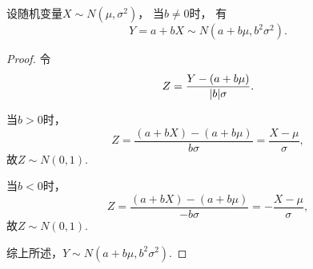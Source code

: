 \begin{proposition}\label{theorem:正态分布与自然指数分布族.正态分布的线性性质}
设随机变量\(X \sim N(\mu,\sigma^2)\)，
当\(b \neq 0\)时，
有\begin{equation}
	Y = a+bX \sim N(a+b\mu,b^2\sigma^2).
\end{equation}
\begin{proof}
令\[
	Z = \frac{Y-(a+b\mu)}{\abs{b}\sigma}.
\]

当\(b > 0\)时，\[
	Z = \frac{(a+bX)-(a+b\mu)}{b\sigma}=\frac{X-\mu}{\sigma},
\]
故\(Z \sim N(0,1)\).

当\(b < 0\)时，\[
Z = \frac{(a+bX)-(a+b\mu)}{-b\sigma}=-\frac{X-\mu}{\sigma},
\]
故\(Z \sim N(0,1)\).

综上所述，\(Y \sim N(a+b\mu,b^2\sigma^2)\).
\end{proof}
\end{proposition}
